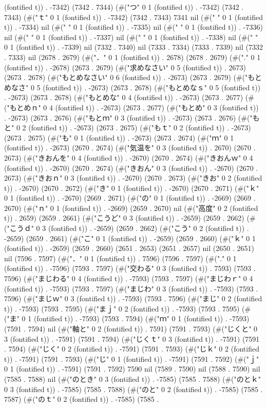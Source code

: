 (fontified t)) . -7342) (7342 . 7344) (#("つ" 0 1 (fontified t)) . -7342) (7342 . 7343) (#("ｔ" 0 1 (fontified t)) . -7342) (7342 . 7343) 7341 nil (#(" " 0 1 (fontified t)) . -7334) nil (#(" " 0 1 (fontified t)) . -7335) nil (#(" " 0 1 (fontified t)) . -7336) nil (#(" " 0 1 (fontified t)) . -7337) nil (#(" " 0 1 (fontified t)) . -7338) nil (#(" " 0 1 (fontified t)) . -7339) nil (7332 . 7340) nil (7333 . 7334) (7333 . 7339) nil (7332 . 7333) nil (2678 . 2679) (#("．" 0 1 (fontified t)) . 2678) (2678 . 2679) (#("." 0 1 (fontified t)) . -2678) (2673 . 2679) (#("求めなさい" 0 5 (fontified t)) . 2673) (2673 . 2678) (#("もとめなさい" 0 6 (fontified t)) . -2673) (2673 . 2679) (#("もとめなさ" 0 5 (fontified t)) . -2673) (2673 . 2678) (#("もとめなｓ" 0 5 (fontified t)) . -2673) (2673 . 2678) (#("もとめな" 0 4 (fontified t)) . -2673) (2673 . 2677) (#("もとめｎ" 0 4 (fontified t)) . -2673) (2673 . 2677) (#("もとめ" 0 3 (fontified t)) . -2673) (2673 . 2676) (#("もとｍ" 0 3 (fontified t)) . -2673) (2673 . 2676) (#("もと" 0 2 (fontified t)) . -2673) (2673 . 2675) (#("もｔ" 0 2 (fontified t)) . -2673) (2673 . 2675) (#("も" 0 1 (fontified t)) . -2673) (2673 . 2674) (#("ｍ" 0 1 (fontified t)) . -2673) (2670 . 2674) (#("気温を" 0 3 (fontified t)) . 2670) (2670 . 2673) (#("きおんを" 0 4 (fontified t)) . -2670) (2670 . 2674) (#("きおんｗ" 0 4 (fontified t)) . -2670) (2670 . 2674) (#("きおん" 0 3 (fontified t)) . -2670) (2670 . 2673) (#("きおｎ" 0 3 (fontified t)) . -2670) (2670 . 2673) (#("きお" 0 2 (fontified t)) . -2670) (2670 . 2672) (#("き" 0 1 (fontified t)) . -2670) (2670 . 2671) (#("ｋ" 0 1 (fontified t)) . -2670) (2669 . 2671) (#("の" 0 1 (fontified t)) . -2669) (2669 . 2670) (#("ｎ" 0 1 (fontified t)) . -2669) (2659 . 2670) nil (#("高度" 0 2 (fontified t)) . 2659) (2659 . 2661) (#("こうど" 0 3 (fontified t)) . -2659) (2659 . 2662) (#("こうｄ" 0 3 (fontified t)) . -2659) (2659 . 2662) (#("こう" 0 2 (fontified t)) . -2659) (2659 . 2661) (#("こ" 0 1 (fontified t)) . -2659) (2659 . 2660) (#("ｋ" 0 1 (fontified t)) . -2659) (2659 . 2660) (2651 . 2653) (2651 . 2657) nil (2650 . 2651) nil (7596 . 7597) (#("．" 0 1 (fontified t)) . 7596) (7596 . 7597) (#("." 0 1 (fontified t)) . -7596) (7593 . 7597) (#("交わる" 0 3 (fontified t)) . 7593) (7593 . 7596) (#("まじわる" 0 4 (fontified t)) . -7593) (7593 . 7597) (#("まじわｒ" 0 4 (fontified t)) . -7593) (7593 . 7597) (#("まじわ" 0 3 (fontified t)) . -7593) (7593 . 7596) (#("まじｗ" 0 3 (fontified t)) . -7593) (7593 . 7596) (#("まじ" 0 2 (fontified t)) . -7593) (7593 . 7595) (#("まｊ" 0 2 (fontified t)) . -7593) (7593 . 7595) (#("ま" 0 1 (fontified t)) . -7593) (7593 . 7594) (#("ｍ" 0 1 (fontified t)) . -7593) (7591 . 7594) nil (#("軸と" 0 2 (fontified t)) . 7591) (7591 . 7593) (#("じくと" 0 3 (fontified t)) . -7591) (7591 . 7594) (#("じくｔ" 0 3 (fontified t)) . -7591) (7591 . 7594) (#("じく" 0 2 (fontified t)) . -7591) (7591 . 7593) (#("じｋ" 0 2 (fontified t)) . -7591) (7591 . 7593) (#("じ" 0 1 (fontified t)) . -7591) (7591 . 7592) (#("ｊ" 0 1 (fontified t)) . -7591) (7591 . 7592) 7590 nil (7589 . 7590) nil (7588 . 7590) nil (7585 . 7588) nil (#("のとき" 0 3 (fontified t)) . -7585) (7585 . 7588) (#("のとｋ" 0 3 (fontified t)) . -7585) (7585 . 7588) (#("のと" 0 2 (fontified t)) . -7585) (7585 . 7587) (#("のｔ" 0 2 (fontified t)) . -7585) (7585 . 